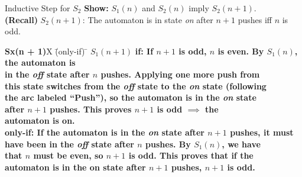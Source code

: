 \documentclass[style=sailor,size=12pt]{powerdot}
\begin{document}
\begin{wideslide}[bm=,toc=]{Inductive Step for $S_2$}
{\bf Show:} $S_1(n)$ and $S_2(n)$ imply $S_2(n + 1)$.\\
{\bf (Recall)} $S_2(n+1)$: The automaton is in state \emph{on} after $n + 1$
pushes iff $n$ is odd.  
\begin{tabbing}
{\bf Sx(n + 1)}X \=  (only-if) \= \kill
{\bf $S_1(n + 1)$}  \>
           \bf{if:} \> 
           If $n + 1$ is odd, $n$ is even. By $S_1(n)$, the automaton is \\
      \>\> in the \emph{off} state after $n$ pushes. Applying one more push from \\
      \>\> this state switches from the \emph{off} state to the \emph{on} state (following \\
      \>\> the arc labeled ``Push''), so the automaton is in the \emph{on} state \\
      \>\> after $n + 1$ pushes. This proves $n + 1$ is odd $\implies$ the \\
      \>\> automaton is on.
           \\[2ex]
      \>
     \bf{only-if:}\> 
           If the automaton is in the \emph{on} state after $n + 1$ pushes, it must \\
      \>\> have been in the \emph{off} state after $n$ pushes. By $S_1(n)$, we have\\
      \>\> that $n$ must be even, so $n+1$ is odd. This proves that if the \\
      \>\> automaton is in the on state after $n + 1$ pushes, $n+1$ is odd. 
           \\[2ex]
\end{tabbing}


\end{wideslide}
\end{document}
